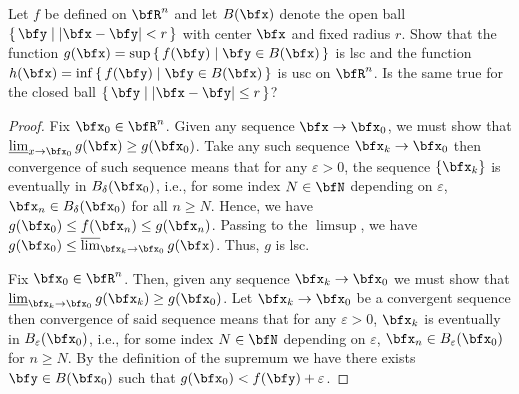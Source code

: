 \begin{problem}
Let $f$ be defined on $\bfR^n$ and let $B(\bfx)$ denote the open ball
$\left\{\,\bfy\;\middle|\;\left|\bfx-\bfy\right|<r\,\right\}$ with center
$\bfx$ and fixed radius $r$. Show that the function
$g(\bfx)=\sup\left\{\,f(\bfy)\;\middle|\;\bfy\in B(\bfx)\,\right\}$ is lsc
and the function $h(\bfx)=\inf\left\{\,f(\bfy)\;\middle|\;\bfy\in
B(\bfx)\,\right\}$ is usc on $\bfR^n$. Is the same true for the closed ball
$\left\{\,\bfy\;\middle|\;\left|\bfx-\bfy\right|\leq r\,\right\}$?
\end{problem}
\begin{proof}
Fix $\bfx_0\in\bfR^n$. Given any sequence $\bfx\to\bfx_0$, we must show
that $\varliminf_{x\to\bfx_0} g(\bfx)\geq g(\bfx_0)$. Take any such
sequence $\bfx_k\to\bfx_0$ then convergence of such sequence means that for
any $\varepsilon>0$, the sequence $\{\bfx_k\}$ is eventually in
$B_\delta(\bfx_0)$, i.e., for some index $N\in\bfN$ depending on
$\varepsilon$, $\bfx_n\in B_\delta(\bfx_0)$ for all $n\geq N$. Hence, we
have $g(\bfx_0)\leq f(\bfx_n)\leq g(\bfx_n)$. Passing to the $\limsup$, we
have $g(\bfx_0)\leq\varlimsup_{\bfx_k\to\bfx_0} g(\bfx)$. Thus, $g$ is lsc.

Fix $\bfx_0\in\bfR^n$. Then, given any sequence $\bfx_k\to\bfx_0$ we must
show that $\varliminf_{\bfx_k\to\bfx_0}g(\bfx_k)\geq g(\bfx_0)$. Let
$\bfx_k\to\bfx_0$ be a convergent sequence then convergence of said
sequence means that for any $\varepsilon>0$, $\bfx_k$ is eventually in
$B_\varepsilon(\bfx_0)$, i.e., for some index $N\in\bfN$ depending on
$\varepsilon$, $\bfx_n\in B_\varepsilon(\bfx_0)$ for $n\geq N$. By the
definition of the supremum we have there exists $\bfy\in B(\bfx_0)$ such
that $g(\bfx_0)<f(\bfy)+\varepsilon$.
\end{proof}
\newpage


